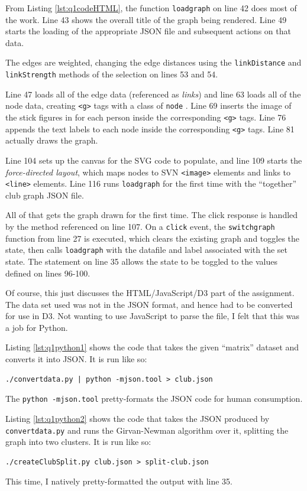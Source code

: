 \documentclass[letterpaper,11pt]{article}
\begin{document}
From Listing \ref{lst:q1codeHTML}, the function \verb+loadgraph+ on line 42 does most of the work.  Line 43 shows the overall title of the graph being rendered.  Line 49 starts the loading of the appropriate JSON file and subsequent actions on that data.

The edges are weighted, changing the edge distances using the \verb+linkDistance+ and \verb+linkStrength+ methods of the selection on lines 53 and 54.

Line 47 loads all of the edge data (referenced as \emph{links}) and line 63 loads all of the node data, creating \verb+<g>+ tags with a class of \verb+node+ \cite{selections}.  Line 69 inserts the image of the stick figures in for each person inside the corresponding \verb+<g>+ tags.  Line 76 appends the text labels to each node inside the corresponding \verb+<g>+ tags.  Line 81 actually draws the graph.

Line 104 sets up the canvas for the SVG code to populate, and line 109 starts the \emph{force-directed layout}, which maps nodes to SVN \verb+<image>+ elements and links to \verb+<line>+ elements\cite{wikiforce}.  Line 116 runs \verb+loadgraph+ for the first time with the ``together'' club graph JSON file.

All of that gets the graph drawn for the first time.  The click response is handled by the method referenced on line 107.  On a \verb+click+ event, the \verb+switchgraph+ function from line 27 is executed, which clears the existing graph and toggles the state, then calls \verb+loadgraph+ with the datafile and label associated with the set state.  The statement on line 35 allows the state to be toggled to the values defined on lines 96-100.

Of course, this just discusses the HTML/JavaScript/D3 part of the assignment.  The data set used was not in the JSON format, and hence had to be converted for use in D3.  Not wanting to use JavaScript to parse the file, I felt that this was a job for Python.

Listing \ref{lst:q1python1} shows the code that takes the given ``matrix'' dataset and converts it into JSON.  It is run like so:
\begin{lstlisting}[frame=single]
./convertdata.py | python -mjson.tool > club.json
\end{lstlisting}
The \verb+python -mjson.tool+ pretty-formats the JSON code for human consumption.

Listing \ref{lst:q1python2} shows the code that takes the JSON produced by \verb+convertdata.py+ and runs the Girvan-Newman algorithm over it, splitting the graph into two clusters.  It is run like so:
\begin{lstlisting}[frame=single]
./createClubSplit.py club.json > split-club.json
\end{lstlisting}
This time, I natively pretty-formatted the output with line 35.
\end{document}
